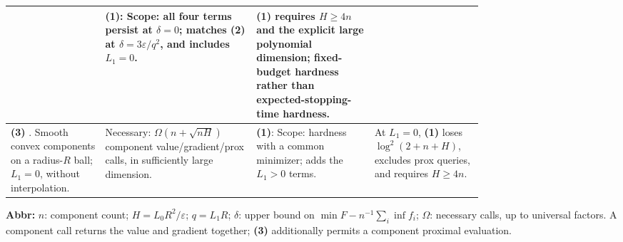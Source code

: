 \begin{table}[tp]
\begin{threeparttable}
\begin{tabularx}{\linewidth}{@{}>{\raggedright\arraybackslash}p{0.20\linewidth}>{\raggedright\arraybackslash}p{0.32\linewidth}>{\raggedright\arraybackslash}p{0.25\linewidth}>{\raggedright\arraybackslash}X@{}}
& \textbf{(1)}: Scope: all four terms persist at $\delta=0$; matches \textbf{(2)} at $\delta=3\varepsilon/q^2$, and includes $L_1=0$.
& \textbf{(1)} requires $H\ge4n$ and the explicit large polynomial dimension; fixed-budget hardness rather than expected-stopping-time hardness. \\
\midrule
\textbf{(3)} \citep[Thm.~7, v3]{eigfsWoodworthSrebroV3}. Smooth convex components on a radius-$R$ ball; $L_1=0$, without interpolation.
& Necessary: $\Omega(n+\sqrt{nH})$ component value/gradient/prox calls, in sufficiently large dimension.
& \textbf{(1)}: Scope: hardness with a common minimizer; adds the $L_1>0$ terms.
& At $L_1=0$, \textbf{(1)} loses $\log^2(2+n+H)$, excludes prox queries, and requires $H\ge4n$. \\
\bottomrule
\end{tabularx}
\begin{tablenotes}[flushleft]\footnotesize
\item[] \textbf{Abbr:} $n$: component count; $H=L_0R^2/\varepsilon$; $q=L_1R$; $\delta$: upper bound on $\min F-n^{-1}\sum_i\inf f_i$; $\Omega$: necessary calls, up to universal factors. A component call returns the value and gradient together; \textbf{(3)} additionally permits a component proximal evaluation.
\end{tablenotes}
\end{threeparttable}
\end{table}
\clearpage
